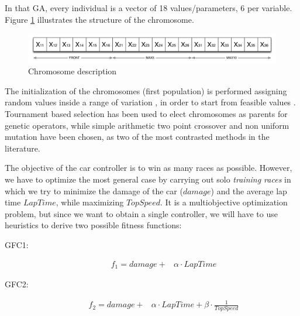 \documentclass[conference]{IEEEtran}
\begin{document}
In that GA, every individual is a vector of 18 values/parameters, 6 per variable. Figure \ref {fig:cromosome} illustrates the structure of the chromosome.
\begin{figure}[!ht]	
  \begin{center}
    \includegraphics[width=12cm]{fig/chromosome2.png}
    \caption{Chromosome description}
    \label{fig:cromosome}	
  \end{center}	
\end{figure}

The initialization of the chromosomes (first population) is performed
assigning random values inside a range of variation
\cite{GAs_Goldberg89}, in order to start from feasible values
\cite{evo17}. 
Tournament based selection has been used to elect chromosomes as
parents for genetic operators, while simple arithmetic two point
crossover \cite{crossGA2017} and non uniform mutation
\cite{mutation1997} have been chosen, as two of the most contrasted
methods in the literature. 



The objective of the car controller is to win as many races as
possible. However, we have to optimize the most general case by
carrying out
solo {\em training races} in which we try to minimize the damage of
the car ($damage$) and the average lap time $LapTime$, while
maximizing $TopSpeed$. It is a multiobjective optimization problem,
but since we want to obtain a single controller, we will have to use
heuristics to derive two possible fitness functions:

\begin{description}
	\item[GFC1:]  
	\begin{equation} \label{fit1}
	\begin{array}{ll}
	f_{1} =   damage + &\alpha \cdot LapTime 
	\end{array}
	\end{equation}
	\item[GFC2:] 
	\begin{equation} \label{fit2}
	\begin{array}{lll}
	f_{2}= damage + &\alpha \cdot  LapTime + \beta \cdot \frac{1}{TopSpeed}
	\end{array}
	\end{equation}	
\end{description} %
\end{document}

